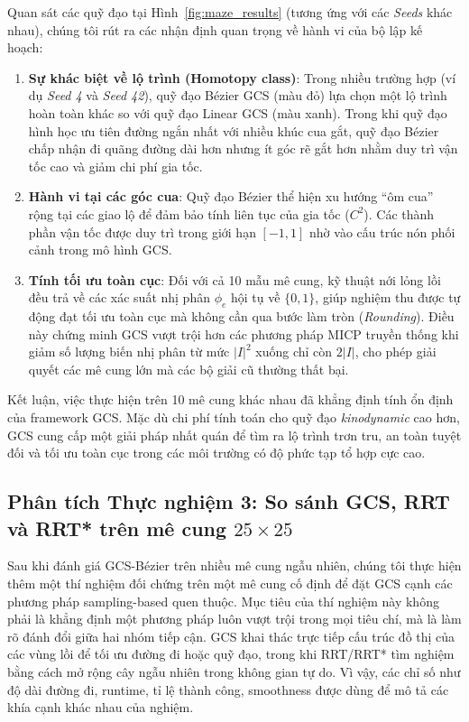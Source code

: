 Quan sát các quỹ đạo tại Hình~\ref{fig:maze_results} (tương ứng với các \textit{Seeds} khác nhau), chúng tôi rút ra các nhận định quan trọng về hành vi của bộ lập kế hoạch:
\begin{enumerate}
    \item \textbf{Sự khác biệt về lộ trình (Homotopy class)}: Trong nhiều trường hợp (ví dụ \textit{Seed 4} và \textit{Seed 42}), quỹ đạo Bézier GCS (màu đỏ) lựa chọn một lộ trình hoàn toàn khác so với quỹ đạo Linear GCS (màu xanh). Trong khi quỹ đạo hình học ưu tiên đường ngắn nhất với nhiều khúc cua gắt, quỹ đạo Bézier chấp nhận đi quãng đường dài hơn nhưng ít góc rẽ gắt hơn nhằm duy trì vận tốc cao và giảm chi phí gia tốc.
    
    \item \textbf{Hành vi tại các góc cua}: Quỹ đạo Bézier thể hiện xu hướng ``ôm cua'' rộng tại các giao lộ để đảm bảo tính liên tục của gia tốc ($C^2$). Các thành phần vận tốc được duy trì trong giới hạn $[-1, 1]$ nhờ vào cấu trúc nón phối cảnh trong mô hình GCS.
    
    \item \textbf{Tính tối ưu toàn cục}: Đối với cả 10 mẫu mê cung, kỹ thuật nới lỏng lồi đều trả về các xác suất nhị phân $\phi_e$ hội tụ về $\{0,1\}$, giúp nghiệm thu được tự động đạt tối ưu toàn cục mà không cần qua bước làm tròn (\textit{Rounding}). Điều này chứng minh GCS vượt trội hơn các phương pháp MICP truyền thống khi giảm số lượng biến nhị phân từ mức $|I|^2$ xuống chỉ còn $2|I|$, cho phép giải quyết các mê cung lớn mà các bộ giải cũ thường thất bại.
\end{enumerate}

Kết luận, việc thực hiện trên 10 mê cung khác nhau đã khẳng định tính ổn định của framework GCS. Mặc dù chi phí tính toán cho quỹ đạo \textit{kinodynamic} cao hơn, GCS cung cấp một giải pháp nhất quán để tìm ra lộ trình trơn tru, an toàn tuyệt đối và tối ưu toàn cục trong các môi trường có độ phức tạp tổ hợp cực cao.


\subsection{Phân tích Thực nghiệm 3: So sánh GCS, RRT và RRT* trên mê cung \texorpdfstring{$25\times 25$}{25x25}}
\label{subsec:rrt_gcs_comparison_results}

Sau khi đánh giá GCS-Bézier trên nhiều mê cung ngẫu nhiên, chúng tôi thực hiện
thêm một thí nghiệm đối chứng trên một mê cung cố định để đặt GCS cạnh các
phương pháp sampling-based quen thuộc.
Mục tiêu của thí nghiệm này không phải là khẳng định một phương pháp luôn vượt
trội trong mọi tiêu chí, mà là làm rõ đánh đổi giữa hai nhóm tiếp cận. GCS khai
thác trực tiếp cấu trúc đồ thị của các vùng lồi để tối ưu đường đi hoặc
quỹ đạo, trong khi RRT/RRT* tìm nghiệm bằng cách mở rộng cây ngẫu nhiên trong
không gian tự do. Vì vậy, các chỉ số như độ dài đường đi, runtime, tỉ lệ thành
công, smoothness được dùng để mô tả các khía cạnh khác nhau của
nghiệm.

